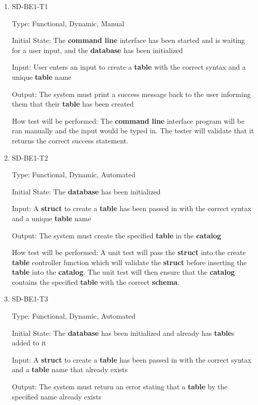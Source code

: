 \documentclass[12pt, titlepage]{article}
\begin{document}
\begin{enumerate}

\item{SD-BE1-T1}

Type: Functional, Dynamic, Manual
					
Initial State: The \textbf{command line} interface has been started and is waiting for a user input, and the \textbf{database} has been initialized
					
Input: User enters an input to create a \textbf{table} with the correct syntax and a unique \textbf{table} name
					
Output: The system must print a success message back to the user informing them that their \textbf{table} has been created
					
How test will be performed: The \textbf{command line} interface program will be ran manually and the input would be typed in. The tester will validate that it returns the correct success statement.

\item{SD-BE1-T2}

Type: Functional, Dynamic, Automated
					
Initial State: The \textbf{database} has been initialized
					
Input: A \textbf{struct} to create a \textbf{table} has been passed in with the correct syntax and a unique \textbf{table} name
					
Output: The system must create the specified \textbf{table} in the \textbf{catalog}
					
How test will be performed: A unit test will pass the \textbf{struct} into the create \textbf{table} controller function which will validate the \textbf{struct} before inserting the \textbf{table} into the \textbf{catalog}. The unit test will then ensure that the \textbf{catalog} contains the specified \textbf{table} with the correct \textbf{schema}.

\item{SD-BE1-T3}

Type: Functional, Dynamic, Automated
					
Initial State: The \textbf{database} has been initialized and already has \textbf{table}s added to it
					
Input: A \textbf{struct} to create a \textbf{table} has been passed in with the correct syntax and a \textbf{table} name that already exists
					
Output: The system must return an error stating that a \textbf{table} by the specified name already exists
					

\end{enumerate}
\end{document}
